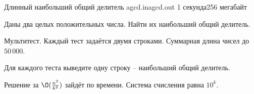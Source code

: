 
\begin{problem}{Длинный наибольший общий делитель}
{agcd.in}{agcd.out}
{1 секунда}{256 мегабайт}{}

Даны два целых положительных числа. Найти их наибольший общий делитель.

\InputFile

Мультитест.
Каждый тест задаётся двумя строками. Суммарная длина чисел до $50\,000$.

\OutputFile

Для каждого теста выведите одну строку -- наибольший общий делитель.

\Examples

\begin{example}
%
\end{example}

\Hint

Решение за $\O(\frac{n^2}{k^2})$ зайдёт по времени. Система счисления равна $10^k$.

\end{problem}
